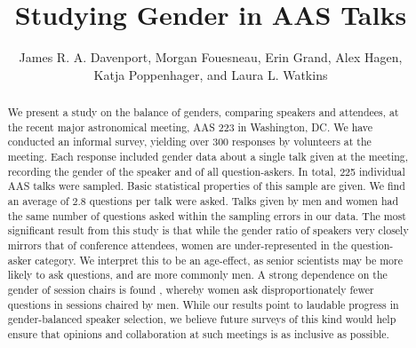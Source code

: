 \documentclass[iop]{emulateapj}
\begin{document}
\title{Studying Gender in AAS Talks}
\author{
	James R. A. Davenport,
	Morgan Fouesneau,
	Erin Grand,
	Alex Hagen,\\
	Katja Poppenhager,
	and Laura L. Watkins
	}



\begin{abstract}
We present a study on the balance of genders, comparing speakers and attendees, at the recent major astronomical meeting, AAS 223 in Washington, DC. We have conducted an informal survey, yielding over 300 responses by volunteers at the meeting. Each response included gender data about a single talk given at the meeting, recording the gender of the speaker and of all question-askers. In total, 225 individual AAS talks were sampled. Basic statistical properties of this sample are given. We find an average of 2.8 questions per talk were asked. Talks given by men and women had the same number of questions asked within the sampling errors in our data. The most significant result from this study is that while the gender ratio of speakers very closely mirrors that of conference attendees, women are under-represented in the question-asker category.  We interpret this to be an age-effect, as senior scientists may be more likely to ask questions, and are more commonly men. A strong dependence on the gender of session chairs is found , whereby women ask disproportionately fewer questions in sessions chaired by men. While our results point to laudable progress in gender-balanced speaker selection, we believe future surveys of this kind would help ensure that opinions and collaboration at such meetings is as inclusive as possible.
\end{abstract}




\end{document}
